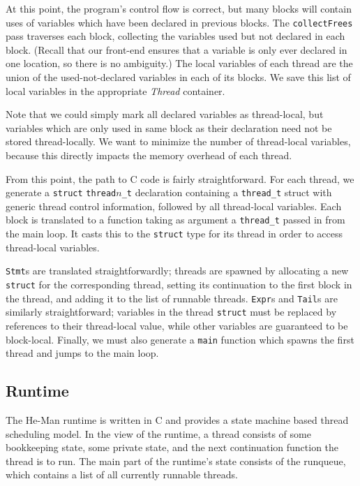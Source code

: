 \documentclass[preprint,11pt]{sigplanconf}
\renewcommand{\t}{\texttt}
\renewcommand{\i}{\textit}
\begin{document}
At this point, the program's control flow is correct, but many blocks will
contain uses of variables which have been declared in previous blocks. The
\t{collectFrees} pass traverses each block, collecting the variables used but
not declared in each block. (Recall that our front-end ensures that a variable
is only ever declared in one location, so there is no ambiguity.) The local
variables of each thread are the union of the used-not-declared variables in
each of its blocks. We save this list of local variables in the appropriate
\i{Thread} container.

Note that we could simply mark all declared variables as thread-local, but
variables which are only used in same block as their declaration need not be
stored thread-locally. We want to minimize the number of thread-local variables,
because this directly impacts the memory overhead of each thread.

From this point, the path to C code is fairly straightforward. For each thread,
we generate a \t{struct} \t{thread$n$\_t} declaration containing a \t{thread\_t}
struct with generic thread control information, followed by all thread-local
variables. Each block is translated to a function taking as argument a
\t{thread\_t} passed in from the main loop. It casts this to the \t{struct} type
for its thread in order to access thread-local variables.

\t{Stmt}s are translated straightforwardly; threads are spawned by allocating a
new \t{struct} for the corresponding thread, setting its continuation to the
first block in the thread, and adding it to the list of runnable threads.
\t{Expr}s and \t{Tail}s are similarly straightforward; variables in the thread
\t{struct} must be replaced by references to their thread-local value, while
other variables are guaranteed to be block-local. Finally, we must also generate
a \t{main} function which spawns the first thread and jumps to the main loop.
  
\subsection{Runtime}

The He-Man runtime is written in C and provides a state machine based
thread scheduling model. In the view of the runtime, a thread consists
of some bookkeeping state, some private state, and the next
continuation function the thread is to run. The main part of the
runtime's state consists of the runqueue, which contains a list of all
currently runnable threads.
\end{document}
